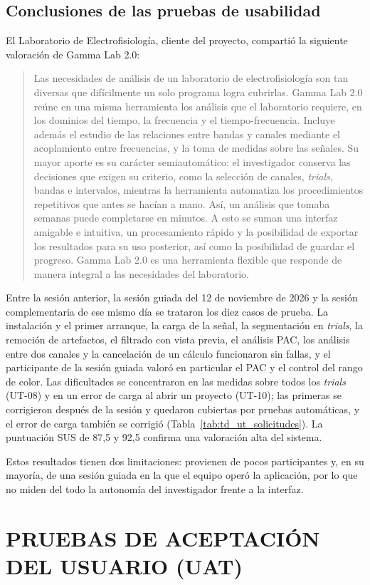\documentclass[12pt,letterpaper,oneside]{article}
\DeclareRobustCommand{\_}{\textunderscore\allowbreak}
\newcommand{\fechasesion}{12 de noviembre de 2026}
\newcommand{\capitulo}[1]{\clearpage\section{#1}}
\begin{document}
\subsection{Conclusiones de las pruebas de usabilidad}
El Laboratorio de Electrofisiología, cliente del proyecto, compartió la siguiente valoración de Gamma Lab 2.0:

\begin{quote}
Las necesidades de análisis de un laboratorio de electrofisiología son tan diversas que difícilmente un solo programa logra cubrirlas. Gamma Lab 2.0 reúne en una misma herramienta los análisis que el laboratorio requiere, en los dominios del tiempo, la frecuencia y el tiempo-frecuencia. Incluye además el estudio de las relaciones entre bandas y canales mediante el acoplamiento entre frecuencias, y la toma de medidas sobre las señales. Su mayor aporte es su carácter semiautomático: el investigador conserva las decisiones que exigen su criterio, como la selección de canales, \textit{trials}, bandas e intervalos, mientras la herramienta automatiza los procedimientos repetitivos que antes se hacían a mano. Así, un análisis que tomaba semanas puede completarse en minutos. A esto se suman una interfaz amigable e intuitiva, un procesamiento rápido y la posibilidad de exportar los resultados para su uso posterior, así como la posibilidad de guardar el progreso. Gamma Lab 2.0 es una herramienta flexible que responde de manera integral a las necesidades del laboratorio.
\end{quote}

Entre la sesión anterior, la sesión guiada del \fechasesion{} y la sesión complementaria de ese mismo día se trataron los diez casos de prueba. La instalación y el primer arranque, la carga de la señal, la segmentación en \textit{trials}, la remoción de artefactos, el filtrado con vista previa, el análisis PAC, los análisis entre dos canales y la cancelación de un cálculo funcionaron sin fallas, y el participante de la sesión guiada valoró en particular el PAC y el control del rango de color. Las dificultades se concentraron en las medidas sobre todos los \textit{trials} (UT-08) y en un error de carga al abrir un proyecto (UT-10); las primeras se corrigieron después de la sesión y quedaron cubiertas por pruebas automáticas, y el error de carga también se corrigió (Tabla~\ref{tab:td_ut_solicitudes}). La puntuación SUS de 87,5 y 92,5 confirma una valoración alta del sistema.

Estos resultados tienen dos limitaciones: provienen de pocos participantes y, en su mayoría, de una sesión guiada en la que el equipo operó la aplicación, por lo que no miden del todo la autonomía del investigador frente a la interfaz.
\capitulo{PRUEBAS DE ACEPTACIÓN DEL USUARIO (UAT)}
\label{sec:td_uat}
\end{document}

